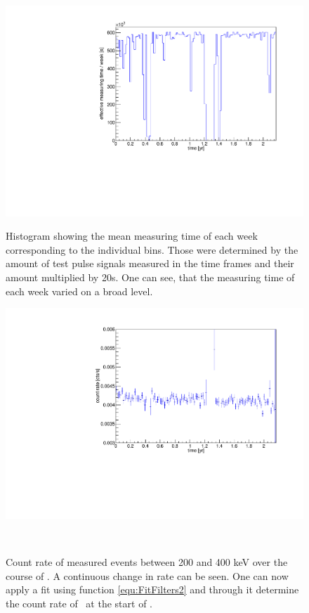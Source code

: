 \begin{figure}[t!]
	\centering
	\begin{minipage}[t]{.475\textwidth}
		\centering
		\includegraphics[width=\textwidth]{./Bilder/testpuler.pdf}
		\caption{
			Histogram showing the mean measuring time of each week corresponding to the individual bins.
			Those were determined by the amount of test pulse signals measured in the time frames and their amount multiplied by 20s.
			One can see, that the measuring time of each week varied on a broad level.
		}
		\label{fig:effectiveMeasuringTimes}
	\end{minipage}\hfill%
	\begin{minipage}[t]{.475\textwidth}
		\centering
		\includegraphics[width=\textwidth]{./Bilder/eventRate.pdf}
		\caption{
			Count rate of measured events between 200 and 400 keV over the course of \PII.
			A continuous change in rate can be seen. 
			One can now apply a fit using function \ref{equ:FitFilters2} and through it determine the count rate of \Kr\ at the start of \PII.
		}
		\label{fig:ChangeInEventRate}
	\end{minipage}
	\\
\end{figure}

